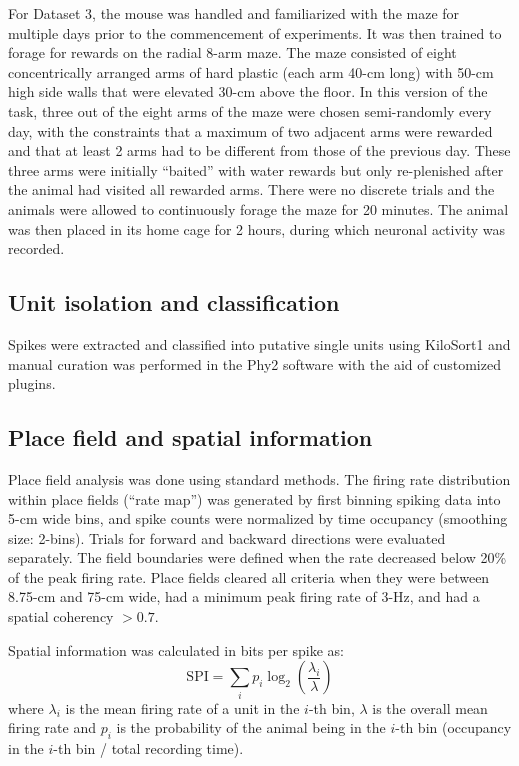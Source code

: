 For Dataset 3, the mouse was handled and familiarized with the maze for multiple days prior to the commencement of experiments. It was then trained to forage for rewards on the radial 8-arm maze. The maze consisted of eight concentrically arranged arms of hard plastic (each arm 40-cm long) with 50-cm high side walls that were elevated 30-cm above the floor. In this version of the task, three out of the eight arms of the maze were chosen semi-randomly every day, with the constraints that a maximum of two adjacent arms were rewarded and that at least 2 arms had to be different from those of the previous day. These three arms were initially ``baited'' with water rewards but only re-plenished after the animal had visited all rewarded arms. There were no discrete trials and the animals were allowed to continuously forage the maze for 20 minutes. The animal was then placed in its home cage for 2 hours, during which neuronal activity was recorded.

\subsection{Unit isolation and classification}

Spikes were extracted and classified into putative single units using KiloSort1 and manual curation was performed in the Phy2 software with the aid of customized plugins.

\subsection{Place field and spatial information}

Place field analysis was done using standard methods. The firing rate distribution within place fields (``rate map'') was generated by first binning spiking data into 5-cm wide bins, and spike counts were normalized by time occupancy (smoothing size: 2-bins). Trials for forward and backward directions were evaluated separately. The field boundaries were defined when the rate decreased below 20\% of the peak firing rate. Place fields cleared all criteria when they were between 8.75-cm and 75-cm wide, had a minimum peak firing rate of 3-Hz, and had a spatial coherency $> 0.7$.

Spatial information was calculated in bits per spike as:
\[
\text{SPI} = \sum_i p_i \log_2 \left( \frac{\lambda_i}{\lambda} \right)
\]
where $\lambda_i$ is the mean firing rate of a unit in the $i$-th bin, $\lambda$ is the overall mean firing rate and $p_i$ is the probability of the animal being in the $i$-th bin (occupancy in the $i$-th bin / total recording time).

